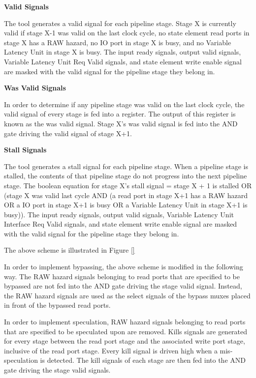 {\bf Valid Signals}

The tool generates a valid signal for each pipeline stage. Stage X is currently valid if stage X-1 was valid on the last clock cycle, no state element read ports in stage X has a RAW hazard, no IO port in stage X is busy, and no Variable Latency Unit in stage X is busy. The input ready signals, output valid signals, Variable Latency Unit Req Valid signals, and state element write enable signal are masked with the valid signal for the pipeline stage they belong in.


{\bf Was Valid Signals}

In order to determine if any pipeline stage was valid on the last clock cycle, the valid signal of every stage is fed into a register. The output of this register is known as the was valid signal. Stage X's was valid signal is fed into the AND gate driving the valid signal of stage X+1.


{\bf Stall Signals}

The tool generates a stall signal for each pipeline stage. When a pipeline stage is stalled, the contents of that pipeline stage do not progress into the next pipeline stage. The boolean equation for stage X's stall signal = stage X + 1 is stalled OR (stage X was valid last cycle AND (a read port in stage X+1 has a RAW hazard OR a IO port in stage X+1 is busy OR a Variable Latency Unit in stage X+1 is busy)). The input ready signals, output valid signals, Variable Latency Unit Interface Req Valid signals, and state element write enable signal are masked with the valid signal for the pipeline stage they belong in. 

The above scheme is illustrated in Figure \ref{}%

In order to implement bypassing, the above scheme is modified in the following way. The RAW hazard signals belonging to read ports that are specified to be bypassed are not fed into the AND gate driving the stage valid signal. Instead, the RAW hazard signals are used as the select signals of the bypass muxes placed in front of the bypassed read ports.

In order to implement speculation, RAW hazard signals belonging to read ports that are specified to be speculated upon are removed. Kills signals are generated for every stage between the read port stage and the associated write port stage, inclusive of the read port stage. Every kill signal is driven high when a mis-speculation is detected. The kill signals of each stage are then fed into the AND gate driving the stage valid signals.

